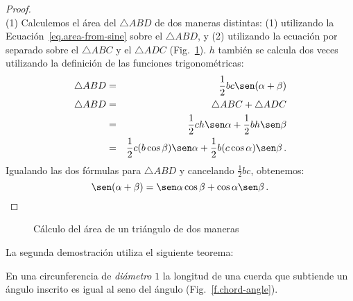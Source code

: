 \begin{proof}
\mbox{}\\
(1)
Calculemos el área del $\triangle ABD$ de dos maneras distintas: (1) utilizando la Ecuación~\ref{eq.area-from-sine} sobre el $\triangle ABD$, y (2) utilizando la ecuación por separado sobre el $\triangle ABC$ y el $\triangle ADC$ (Fig.~\ref{f.sin-sum2}).
$h$ también se calcula dos veces utilizando la definición de las funciones trigonométricas:
\begin{eqnarray*}
\triangle ABD &=& \frac{1}{2}bc\sen(\alpha+\beta)\\
\triangle ABD &=& \triangle ABC+\triangle ADC\\
&=& \frac{1}{2}ch\sen \alpha + \frac{1}{2}bh\sen \beta\\
&=& \frac{1}{2}c(b\cos\beta)\sen \alpha + \frac{1}{2}b(c\cos\alpha)\sen \beta\,.
\end{eqnarray*}
Igualando las dos fórmulas para $\triangle ABD$ y cancelando $\frac{1}{2}bc$, obtenemos:
\[
\sen(\alpha+\beta)=\sen\alpha\cos\beta+\cos \alpha\sen\beta\,.
\]
\end{proof}

\begin{figure}[tb]
\begin{center}
\end{center}
\caption{Cálculo del área de un triángulo de dos maneras}\label{f.sin-sum2}
\end{figure}

\newpage

La segunda demostración utiliza el siguiente teorema:
\begin{theorem}
En una circunferencia de \emph{diámetro} $1$ la longitud de una cuerda que subtiende un ángulo inscrito es igual al seno del ángulo (Fig.~\ref{f.chord-angle}).
\end{theorem}

